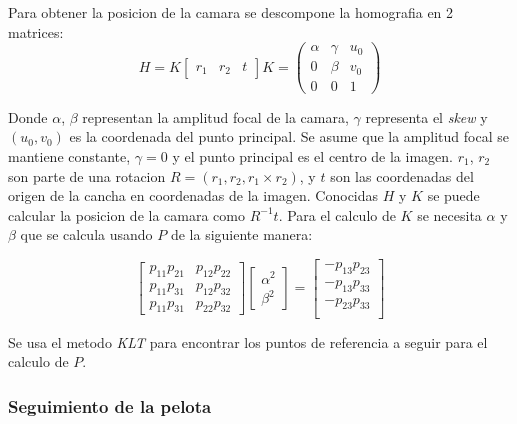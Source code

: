 \documentclass[a4paper,10pt]{article}
\begin{document}
Para obtener la posicion de la camara se descompone la homografia en 2 matrices:
\begin{equation}
H = K \begin{bmatrix} r_1 & r_2 & t \end{bmatrix}
K = \begin{pmatrix} 
    \alpha & \gamma & u_0 \\
    0 & \beta & v_0 \\
    0 & 0 & 1
    \end{pmatrix}
\end{equation}

Donde $\alpha$, $\beta$ representan la amplitud focal de la camara, $\gamma$ representa el \textit{skew} y $(u_0, v_0)$ es la coordenada del punto principal.
Se asume que la amplitud focal se mantiene constante, $\gamma = 0$ y el punto principal es el centro de la imagen.
$r_1$, $r_2$ son parte de una rotacion $R = (r_1, r_2, r_1 \times r_2)$, y $t$ son las coordenadas del origen de la cancha en coordenadas de la imagen.
Conocidas $H$ y $K$ se puede calcular la posicion de la camara como $R^{-1} t$.
Para el calculo de $K$ se necesita $\alpha$ y $\beta$ que se calcula usando $P$ de la siguiente manera:

\begin{equation}
\begin{bmatrix}
    p_{1 1} p_{2 1} & p_{1 2} p_{2 2} \\
    p_{1 1} p_{3 1} & p_{1 2} p_{3 2} \\
    p_{1 1} p_{3 1} & p_{2 2} p_{3 2} 
\end{bmatrix} 
\begin{bmatrix}
    \alpha^2 \\
    \beta^2
\end{bmatrix}
 =
\begin{bmatrix}
    - p_{1 3} p_{2 3} \\
    - p_{1 3} p_{3 3} \\
    - p_{2 3} p_{3 3} \\
\end{bmatrix}
\end{equation}

Se usa el metodo \textit{KLT} \cite{KLT} para encontrar los puntos de referencia a seguir para el calculo de $P$.

\subsubsection*{Seguimiento de la pelota}
\end{document}
